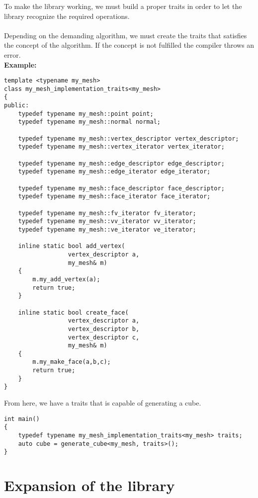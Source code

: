 \begin{appendices}
To make the library working, we must build a proper traits in order to let the library recognize
the required operations.\\
\\
Depending on the demanding algorithm, we must create the traits that satisfies the concept
of the algorithm. If the concept is not fulfilled the compiler throws an error.\\

\textbf{Example:}

\begin{lstlisting}
template <typename my_mesh>
class my_mesh_implementation_traits<my_mesh>
{
public:
	typedef typename my_mesh::point point;
	typedef typename my_mesh::normal normal;

	typedef typename my_mesh::vertex_descriptor vertex_descriptor;
	typedef typename my_mesh::vertex_iterator vertex_iterator;

	typedef typename my_mesh::edge_descriptor edge_descriptor;
	typedef typename my_mesh::edge_iterator edge_iterator;

	typedef typename my_mesh::face_descriptor face_descriptor;
	typedef typename my_mesh::face_iterator face_iterator;

	typedef typename my_mesh::fv_iterator fv_iterator;
	typedef typename my_mesh::vv_iterator vv_iterator;
	typedef typename my_mesh::ve_iterator ve_iterator;
	
	inline static bool add_vertex(
				  vertex_descriptor a,
		  	  	  my_mesh& m)
	{
		m.my_add_vertex(a);
		return true;
	}		
	
	inline static bool create_face(
				  vertex_descriptor a,
				  vertex_descriptor b,
				  vertex_descriptor c,
		  	  	  my_mesh& m)
	{
		m.my_make_face(a,b,c);
		return true;
	}
}
\end{lstlisting}

From here, we have a traits that is capable of generating a cube.

\begin{lstlisting}
int main()
{
	typedef typename my_mesh_implementation_traits<my_mesh> traits;
	auto cube = generate_cube<my_mesh, traits>();
}
\end{lstlisting}

\chapter{Expansion of the library}

\end{appendices}